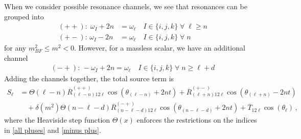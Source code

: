 \documentclass[letterpaper,11pt]{article}
\begin{document}
When we consider possible resonance channels, we see that resonances can be grouped into
\begin{align}
\label{all pluses}
(++): \; \omega_I + 2n &= \omega_\ell \quad I \in \{i,j,k\} \; \forall \; \ell \geq n \\
(+-): \, \omega_I - 2n &=\omega_\ell \quad I \in \{i,j,k\} \; \forall \; n
\end{align}
for any $m^2_{BF} \leq m^2 < 0$. However, for a massless scalar, we have an additional channel
\begin{align}
\label{minus plus}
(-+): \, -\omega_I + 2n = \omega_\ell \quad I \in \{i,j,k\} \; \forall \; n \geq \ell + d
\end{align}
Adding the channels together, the total source term is
\begin{align}
S_\ell &=\Theta \left( \ell - n \right)  \overline{R}^{(++)}_{(\ell - n) 1 2 \ell} \cos \left( \theta_{(\ell - n)} + 2nt \right) + \overline{R}^{(+-)}_{(\ell + n) 1 2 \ell } \cos\left( \theta_{(\ell + n)} - 2nt \right) \nonumber \\
%
& \quad + \delta(m^2) \Theta\left( n - \ell - d \right) \overline{R}^{(-+)}_{(n - \ell - d) 1 2 \ell} \cos \left( \theta_{(n - \ell - d)} + 2nt \right) + \overline{T}_{12\ell} \cos \left( \theta_\ell \right) \, ,
\end{align}
where the Heaviside step function $\Theta(x)$ enforces the restrictions on the indices in \eqref{all pluses} and \eqref{minus plus}.
\end{document}
